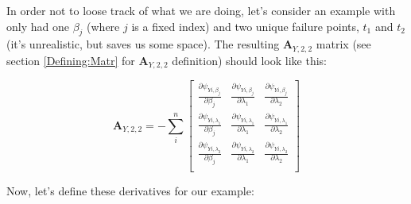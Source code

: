 \documentclass[]{article}
\begin{document}
In order not to loose track of what we are doing, let's consider an example with only had one $\beta_j$ (where $j$ is a fixed index) and two unique failure points, $t_1$ and $t_2$ (it's unrealistic, but saves us some space). The resulting $\pmb{A}_{Y,2,2}$ matrix (see section \ref{Defining:Matr} for  $\pmb{A}_{Y,2,2}$ definition) should look like this: 

  \[
  \pmb{A}_{Y,2,2} = -\sum_i^n\begin{bmatrix}
      \frac{\partial \psi_{Yi,\beta_j}}{ \partial \beta_j} &
      \frac{\partial \psi_{Yi,\beta_j}}{ \partial \lambda_1} &
      \frac{\partial \psi_{Yi,\beta_j}}{ \partial \lambda_2} \\
      \frac{\partial \psi_{Yi,\lambda_1}}{ \partial \beta_j} &
      \frac{\partial \psi_{Yi,\lambda_1}}{ \partial \lambda_1} &
      \frac{\partial \psi_{Yi,\lambda_1}}{ \partial \lambda_2} \\
      \frac{\partial \psi_{Yi,\lambda_2}}{ \partial \beta_j} &
      \frac{\partial \psi_{Yi,\lambda_2}}{ \partial \lambda_1} &
      \frac{\partial \psi_{Yi,\lambda_2}}{ \partial \lambda_2}\\
  \end{bmatrix}
  \]

Now, let's define these derivatives for our example:
\end{document}
